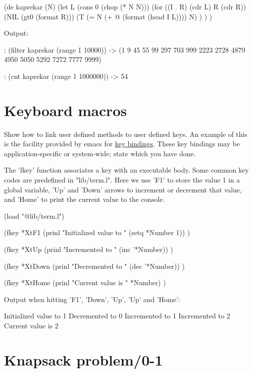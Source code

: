 \begin{wideverbatim}

(de kaprekar (N)
   (let L (cons 0 (chop (* N N)))
      (for ((I . R) (cdr L) R (cdr R))
         (NIL (gt0 (format R)))
         (T (= N (+ @ (format (head I L)))) N) ) ) )

Output:

: (filter kaprekar (range 1 10000))
-> (1 9 45 55 99 297 703 999 2223 2728 4879 4950 5050 5292 7272 7777 9999)

: (cnt kaprekar (range 1 1000000))
-> 54

\end{wideverbatim}

\pagebreak{}
\section*{Keyboard macros}

Show how to link user defined methods to user defined keys. An example
of this is the facility provided by emacs for
\href{http://www.gnu.org/software/emacs/manual/html\_node/emacs/Key-Bindings.html}{key
bindings}. These key bindings may be application-specific or
system-wide; state which you have done.

\begin{wideverbatim}

The 'fkey' function associates a key with an executable body. Some common key
codes are predefined in "lib/term.l". Here we use 'F1' to store the value 1 in
a global variable, 'Up' and 'Down' arrows to increment or decrement that value,
and 'Home' to print the current value to the console.

(load "@lib/term.l")

(fkey *XtF1
   (prinl "Initialized value to " (setq *Number 1)) )

(fkey *XtUp
   (prinl "Incremented to " (inc '*Number)) )

(fkey *XtDown
   (prinl "Decremented to " (dec '*Number)) )

(fkey *XtHome
   (prinl "Current value is " *Number) )

Output when hitting 'F1', 'Down', 'Up', 'Up' and 'Home':

Initialized value to 1
Decremented to 0
Incremented to 1
Incremented to 2
Current value is 2

\end{wideverbatim}

\pagebreak{}
\section*{Knapsack problem/0-1}

